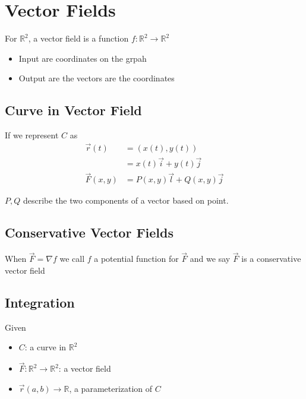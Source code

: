 \section{Vector Fields}

  For $ \mathbb{R}^{2} $, a vector field is a function
  $ f: \mathbb{R}^{2} \to \mathbb{R}^{2} $
  \begin{itemize}
    \item Input are coordinates on the grpah
    \item Output are the vectors are the coordinates
  \end{itemize}

  \subsection{Curve in Vector Field}

    If we represent $ C $ as
    \begin{align*}
      \vec{r}\left( t \right)
        &= \left( x\left(t\right), y\left(t\right) \right) \\
        &= x\left( t \right) \vec{i} + y\left( t \right) \vec{j} \\
      \vec{F}\left( x, y \right)
        &= P\left( x, y \right) \vec{l} + Q\left( x, y \right) \vec{j}
    \end{align*}

    $ P, Q $ describe the two components of a vector based on point.

  \subsection{Conservative Vector Fields}

    When $ \vec{F} = \nabla f $ we call $ f $ a potential function
    for $ \vec{F} $ and we say $ \vec{F} $ is a conservative vector field

  \subsection{Integration}

    Given
    \begin{itemize}
      \item $ C $: a curve in $ \mathbb{R}^{2} $
      \item $ \vec{F}: \mathbb{R}^{2} \to \mathbb{R}^{2} $: a vector field
      \item $ \vec{r}\left( a, b \right) \to \mathbb{R} $, a parameterization
      of $ C $
    \end{itemize}


